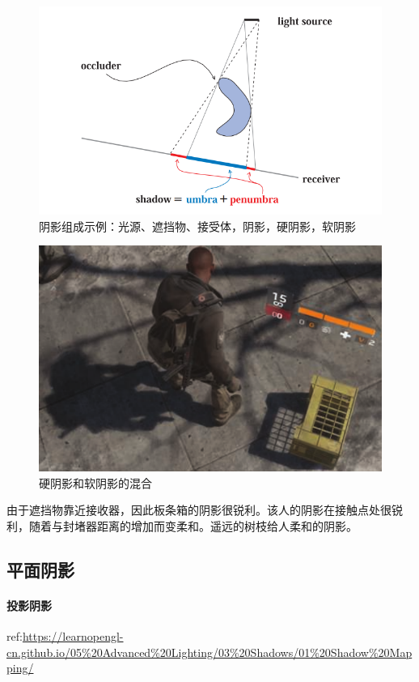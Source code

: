 \documentclass[UTF8,a4paper,12pt]{ctexbook}
\begin{document}
			\begin{figure}[H]
				\centering
				\includegraphics[width=\linewidth]{Shadow01}
				\caption{阴影组成示例：光源、遮挡物、接受体，阴影，硬阴影，软阴影}
			\end{figure}
				
			\begin{figure}[H]
				\centering
				\includegraphics[width=\linewidth]{Shadow02}
				\caption{硬阴影和软阴影的混合}
			\end{figure}			
			由于遮挡物靠近接收器，因此板条箱的阴影很锐利。该人的阴影在接触点处很锐利，随着与封堵器距离的增加而变柔和。遥远的树枝给人柔和的阴影。
			
		\subsection{平面阴影}
			\paragraph{投影阴影}
				ref:\url{https://learnopengl-cn.github.io/05%20Advanced%20Lighting/03%20Shadows/01%20Shadow%20Mapping/}
			
\end{document}
